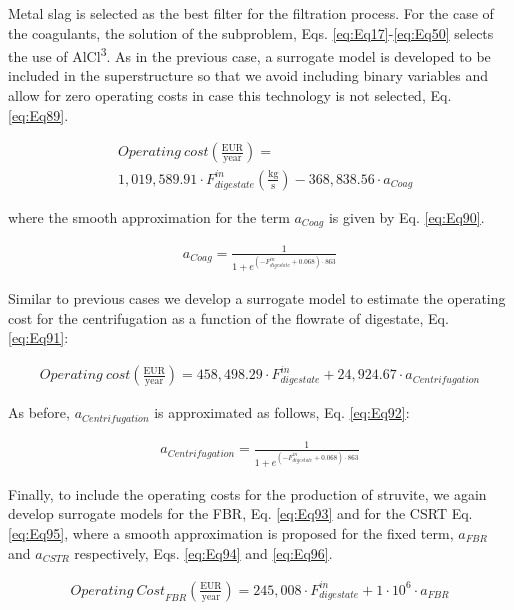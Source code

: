 \begin{refsection}[referencesCh2]
Metal slag is selected as the best filter for the filtration process. For the case of the coagulants, the solution of the subproblem, Eqs. \ref{eq:Eq17}-\ref{eq:Eq50} selects the use of AlCl\textsuperscript{3}. As in the previous case, a surrogate model is developed to be included in the superstructure so that we avoid including binary variables and allow for zero operating costs in case this technology is not selected, Eq. \ref{eq:Eq89}.

\begin{align}
	& {Operating \ cost} \left( \frac{\text{EUR}}{\text{year}} \right) = \label{eq:Eq89} \\
	& 1,019,589.91 \cdot F_{digestate}^{in} \left( \frac{\text{kg}}{\text{s}} \right) -368,838.56 \cdot {a}_{Coag} \nonumber
\end{align}

where the smooth approximation for the term ${a}_{Coag}$ is given by Eq. \ref{eq:Eq90}.

\begin{align}
	{a}_{Coag} = \frac{1}{1 + e^{\left( -F_{digestate}^{in} + 0.068 \right) \cdot 863}} \label{eq:Eq90}
\end{align}

Similar to previous cases we develop a surrogate model to estimate the operating cost for the centrifugation as a function of the flowrate of digestate, Eq. \ref{eq:Eq91}:

\begin{align}
	{Operating \ cost} \left( \frac{\text{EUR}}{\text{year}} \right) = 458,498.29 \cdot F_{digestate}^{in} +  24,924.67 \cdot {a}_{Centrifugation} \label{eq:Eq91}
\end{align}

As before, ${a}_{Centrifugation}$ is approximated as follows, Eq. \ref{eq:Eq92}:

\begin{align}
	{a}_{Centrifugation} = \frac{1}{1 + e^{\left( { - F_{digestate}^{in} + 0.068} \right) \cdot 863}} \label{eq:Eq92}
\end{align}

Finally, to include the operating costs for the production of struvite, we again develop surrogate models for the FBR, Eq. \ref{eq:Eq93} and for the CSRT Eq. \ref{eq:Eq95}, where a smooth approximation is proposed for the fixed term, $a_{FBR}$ and $a_{CSTR}$ respectively, Eqs. \ref{eq:Eq94} and \ref{eq:Eq96}.

\begin{align}
	{Operating \ Cost}_{FBR} \left( \frac{\text{EUR}}{\text{year}} \right) = 245,008 \cdot F_{digestate}^{in} +  1 \cdot {10^6} \cdot {a}_{FBR} \label{eq:Eq93}
\end{align}


\end{refsection}
